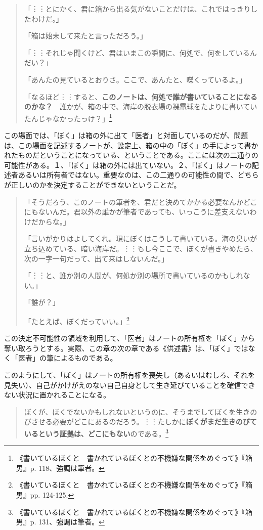 \documentclass[9pt,b5j,twoside,twocolumn]{utarticle}
\begin{document}
\begin{quotation}
「︙︙とにかく、君に箱から出る気がないことだけは、これではっきりしたわけだ。」
	
「箱は始末して来たと言っただろう。」
	
「︙︙それじゃ聞くけど、君はいまこの瞬間に、何処で、何をしているんだい？」
	
「あんたの見ているとおりさ。ここで、あんたと、喋くっているよ。」
	
「なるほど︙︙すると、\textbf{このノートは、何処で誰が書いていることになるのかな？}　誰かが、箱の中で、海岸の脱衣場の裸電球をたよりに書いていたんじゃなかったっけ？」\footnote{《書いているぼくと　書かれているぼくとの不機嫌な関係をめぐって》『箱男』p. 118、強調は筆者。}	
\end{quotation}

この場面では、「ぼく」は箱の外に出て「医者」と対面しているのだが、問題は、この場面を記述するノートが、設定上、箱の中の「ぼく」の手によって書かれたものだということになっている、ということである。ここには次の二通りの可能性がある。１、「ぼく」は箱の外には出ていない。２、「ぼく」はノートの記述者あるいは所有者ではない。重要なのは、この二通りの可能性の間で、どちらが正しいのかを決定することができないということだ。

\begin{quotation}
「そうだろう、このノートの筆者を、君だと決めてかかる必要なんかどこにもないんだ。君以外の誰かが筆者であっても、いっこうに差支えないわけだからな。」

「言いがかりはよしてくれ。現にぼくはこうして書いている。海の臭いが立ち込めている、暗い海岸だ。︙︙もし今ここで、ぼくが書きやめたら、次の一字一句だって、出て来はしないんだ。」

「︙︙と、誰か別の人間が、何処か別の場所で書いているのかもしれない。」

「誰が？」

「たとえば、ぼくだっていい。」\footnote{《書いているぼくと　書かれているぼくとの不機嫌な関係をめぐって》『箱男』pp. 124-125.}
\end{quotation}

この決定不可能性の領域を利用して、「医者」はノートの所有権を「ぼく」から奪い取ろうとする。実際、この章の次の章である《供述書》は、「ぼく」ではなく「医者」の筆によるものである。

このようにして、「ぼく」はノートの所有権を喪失し（あるいはむしろ、それを見失い）、自己がかけがえのない自己自身として生き延びていることを確信できない状況に置かれることになる。

\begin{quotation}
ぼくが、ぼくでないかもしれないというのに、そうまでしてぼくを生きのびさせる必要がどこにあるのだろう。︙︙たしかに\textbf{ぼくがまだ生きのびているという証拠は、どこにもない}のである。\footnote{《書いているぼくと　書かれているぼくとの不機嫌な関係をめぐって》『箱男』p. 131、強調は筆者。}
\end{quotation}
\end{document}
